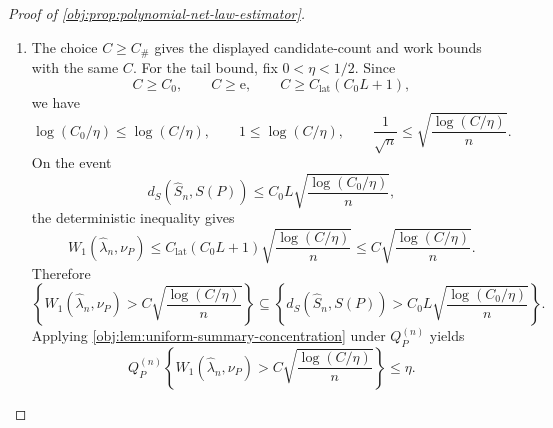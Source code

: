 \documentclass[11pt]{article}
\begin{document}
\begin{proof}[Proof of \cref{obj:prop:polynomial-net-law-estimator}]
\begin{enumerate}
\item The choice \(C\ge C_\#\) gives the displayed candidate-count and work bounds with the same \(C\).  For the tail bound, fix \(0<\eta<1/2\).  Since
\[
C\ge C_0,\qquad C\ge\mathrm e,\qquad C\ge C_{\mathrm{lat}}(C_0L+1),
\]
we have
\[
\log(C_0/\eta)\le\log(C/\eta),
\qquad
1\le\log(C/\eta),
\qquad
\frac1{\sqrt n}\le\sqrt{\frac{\log(C/\eta)}{n}}.
\]
On the event
\[
d_S(\widehat S_n,S(P))
\le
C_0L\sqrt{\frac{\log(C_0/\eta)}{n}},
\]
the deterministic inequality gives
\[
W_1(\widehat\lambda_n,\nu_P)
\le
C_{\mathrm{lat}}(C_0L+1)
\sqrt{\frac{\log(C/\eta)}{n}}
\le
C\sqrt{\frac{\log(C/\eta)}{n}}.
\]
Therefore
\[
\left\{
W_1(\widehat\lambda_n,\nu_P)>
C\sqrt{\frac{\log(C/\eta)}{n}}
\right\}
\subseteq
\left\{
d_S(\widehat S_n,S(P))>
C_0L\sqrt{\frac{\log(C_0/\eta)}{n}}
\right\}.
\]
Applying \cref{obj:lem:uniform-summary-concentration} under \(Q_P^{(n)}\) yields
\[
Q_P^{(n)}
\left\{
W_1(\widehat\lambda_n,\nu_P)>
C\sqrt{\frac{\log(C/\eta)}{n}}
\right\}
\le\eta .
\] %
\end{enumerate}
\end{proof}
\end{document}
